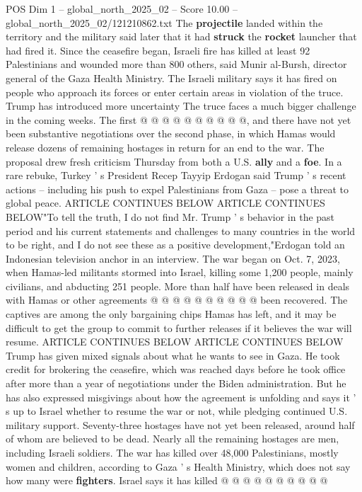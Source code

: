\begin{textsample}{POS Dim 1 – global\_north\_2025\_02 – Score 10.00 – global\_north\_2025\_02/121210862.txt}
The \textbf{projectile} landed within the territory and the military said later that it had \textbf{struck} the \textbf{rocket} launcher that had fired it.
Since the ceasefire began, Israeli fire has killed at least 92 Palestinians and wounded more than 800 others, said Munir al-Bursh, director general of the Gaza Health Ministry.
The Israeli military says it has fired on people who approach its forces or enter certain areas in violation of the truce.
Trump has introduced more uncertainty The truce faces a much bigger challenge in the coming weeks.
The first @ @ @ @ @ @ @ @ @ @, and there have not yet been substantive negotiations over the second phase, in which Hamas would release dozens of remaining hostages in return for an end to the war.
The proposal drew fresh criticism Thursday from both a U.S. \textbf{ally} and a \textbf{foe}.
In a rare rebuke, Turkey ' s President Recep Tayyip Erdogan said Trump ' s recent actions -- including his push to expel Palestinians from Gaza -- pose a threat to global peace.
ARTICLE CONTINUES BELOW ARTICLE CONTINUES BELOW"To tell the truth, I do not find Mr.
Trump ' s behavior in the past period and his current statements and challenges to many countries in the world to be right, and I do not see these as a positive development,"Erdogan told an Indonesian television anchor in an interview.
The war began on Oct. 7, 2023, when Hamas-led militants stormed into Israel, killing some 1,200 people, mainly civilians, and abducting 251 people.
More than half have been released in deals with Hamas or other agreements @ @ @ @ @ @ @ @ @ @ been recovered.
The captives are among the only bargaining chips Hamas has left, and it may be difficult to get the group to commit to further releases if it believes the war will resume.
ARTICLE CONTINUES BELOW ARTICLE CONTINUES BELOW Trump has given mixed signals about what he wants to see in Gaza.
He took credit for brokering the ceasefire, which was reached days before he took office after more than a year of negotiations under the Biden administration.
But he has also expressed misgivings about how the agreement is unfolding and says it ' s up to Israel whether to resume the war or not, while pledging continued U.S. military support.
Seventy-three hostages have not yet been released, around half of whom are believed to be dead.
Nearly all the remaining hostages are men, including Israeli soldiers.
The war has killed over 48,000 Palestinians, mostly women and children, according to Gaza ' s Health Ministry, which does not say how many were \textbf{fighters}.
Israel says it has killed @ @ @ @ @ @ @ @ @ @

\end{textsample}

